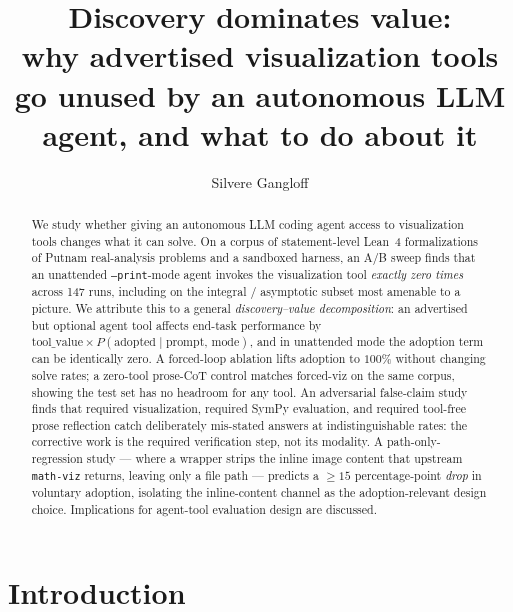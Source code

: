 \documentclass[letterpaper]{article}
\title{Discovery dominates value: \\
  why advertised visualization tools go unused by an autonomous LLM
  agent, and what to do about it}
\author{
  Silvere Gangloff
}
\begin{document}
\maketitle

\begin{abstract}
%
We study whether giving an autonomous LLM coding agent access to
visualization tools changes what it can solve. On a corpus of
statement-level Lean~4 formalizations of Putnam real-analysis
problems and a sandboxed harness, an A/B sweep finds that an
unattended \texttt{--print}-mode agent invokes the visualization tool
\emph{exactly zero times} across 147 runs, including on the
integral / asymptotic subset most amenable to a picture. We attribute
this to a general
\emph{discovery--value decomposition}: an advertised but optional
agent tool affects end-task performance by
$\text{tool\_value} \times P(\text{adopted} \mid \text{prompt, mode})$,
and in unattended mode the adoption term can be identically zero.
A forced-loop ablation lifts adoption to $100\%$ without changing
solve rates; a zero-tool prose-CoT control matches forced-viz on the
same corpus, showing the test set has no headroom for any tool. An
adversarial false-claim study finds that required visualization,
required SymPy evaluation, and required tool-free prose reflection
catch deliberately mis-stated answers at indistinguishable rates: the
corrective work is the required verification step, not its modality.
A path-only-regression study --- where a wrapper strips the inline
image content that upstream \texttt{math-viz} returns, leaving only
a file path --- predicts a $\geq 15$ percentage-point \emph{drop} in
voluntary adoption, isolating the inline-content channel as the
adoption-relevant design choice. Implications for agent-tool
evaluation design are discussed.
\end{abstract}

\section{Introduction}
\end{document}
